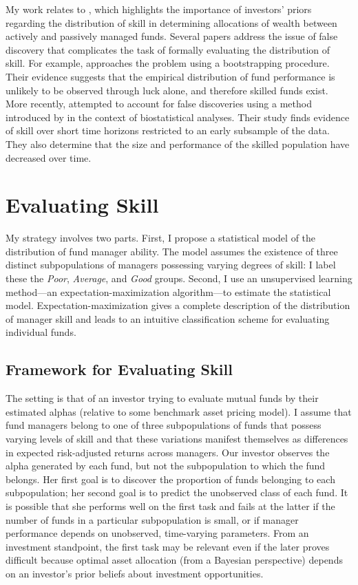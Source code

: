 	My work relates to \citet{Baks2001}, which highlights the importance of investors' priors regarding the distribution of skill in determining allocations of wealth between actively and passively managed funds. Several papers address the issue of false discovery that complicates the task of formally evaluating the distribution of skill. For example, \citet{Kosowski2006} approaches the problem using a bootstrapping procedure. Their evidence suggests that the empirical distribution of fund performance is unlikely to be observed through luck alone, and therefore skilled funds exist. More recently, \citet{Barras2010} attempted to account for false discoveries using a method introduced by \citet{Storey2002} in the context of biostatistical analyses. Their study finds evidence of skill over short time horizons restricted to an early subsample of the data. They also determine that the size and performance of the skilled population have decreased over time.


\section{Evaluating Skill}
	My strategy involves two parts.  First, I propose a statistical model of the distribution of fund manager ability.  The model assumes the existence of three distinct subpopulations of managers possessing varying degrees of skill: I label these the \textit{Poor}, \textit{Average}, and \textit{Good} groups. Second, I use an unsupervised learning method---an expectation-maximization algorithm---to estimate the statistical model.  Expectation-maximization gives a complete description of the distribution of manager skill and leads to an intuitive classification scheme for evaluating individual funds.

	\subsection{Framework for Evaluating Skill}
		The setting is that of an investor trying to evaluate mutual funds by their estimated alphas (relative to some benchmark asset pricing model). I assume that fund managers belong to one of three subpopulations of funds that possess varying levels of skill and that these variations manifest themselves as differences in expected risk-adjusted returns across managers. Our investor observes the alpha generated by each fund, but not the subpopulation to which the fund belongs. Her first goal is to discover the proportion of funds belonging to each subpopulation; her second goal is to predict the unobserved class of each fund. It is possible that she performs well on the first task and fails at the latter if the number of funds in a particular subpopulation is small, or if manager performance depends on unobserved, time-varying parameters. From an investment standpoint, the first task may be relevant even if the later proves difficult because optimal asset allocation (from a Bayesian perspective) depends on an investor's prior beliefs about investment opportunities.

